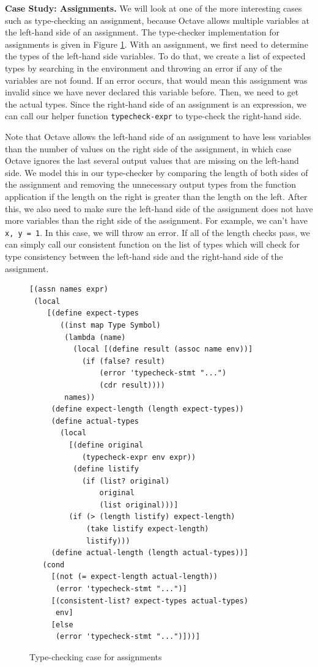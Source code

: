 {\bf Case Study: Assignments.} We will look at one of the more interesting cases such as type-checking an assignment, because Octave allows multiple variables at the left-hand side of an assignment. The type-checker implementation for assignments is given in Figure \ref{fig:assn}. With an assignment, we first need to determine the types of the left-hand side variables. To do that, we create a list of expected types by searching in the environment and throwing an error if any of the variables are not found. If an error occurs, that would mean this assignment was invalid since we have never declared this variable before. Then, we need to get the actual types. Since the right-hand side of an assignment is an expression, we can call our helper function {\tt typecheck-expr} to type-check the right-hand side.

Note that Octave allows the left-hand side of an assignment to have less variables than the number of values on the right side of the assignment, in which case Octave ignores the last several output values that are missing on the left-hand side. We model this in our type-checker by comparing the length of both sides of the assignment and removing the unnecessary output types from the function application if the length on the right is greater than the length on the left. After this, we also need to make sure the left-hand side of the assignment does not have more variables than the right side of the assignment. For example, we can't have {\tt x, y = 1}. In this case, we will throw an error. If all of the length checks pass, we can simply call our consistent function on the list of types which will check for type consistency between the left-hand side and the right-hand side of the assignment.  

\begin{figure}[h]
    \begin{lstlisting}[language=racket]
[(assn names expr)
 (local
    [(define expect-types
       ((inst map Type Symbol)
        (lambda (name)
          (local [(define result (assoc name env))]
            (if (false? result)
                (error 'typecheck-stmt "...")
                (cdr result))))
        names))
     (define expect-length (length expect-types))
     (define actual-types
       (local
         [(define original
            (typecheck-expr env expr))
          (define listify
            (if (list? original)
                original
                (list original)))]
         (if (> (length listify) expect-length)
             (take listify expect-length)
             listify)))
     (define actual-length (length actual-types))]
   (cond
     [(not (= expect-length actual-length))
      (error 'typecheck-stmt "...")]
     [(consistent-list? expect-types actual-types)
      env]
     [else
      (error 'typecheck-stmt "...")]))]
    \end{lstlisting}
    \caption[]{Type-checking case for assignments}
    \label{fig:assn}
\end{figure}



